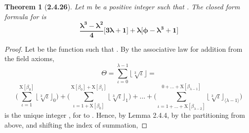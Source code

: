 \documentclass[a4paper, 12pt]{article}
\theoremstyle{plain}
\newtheorem*{theorem*}{Theorem}
\begin{document}
\begin{theorem*}[\textbf{2.4.26}]
    Let m be a positive integer such that 
    \bm{$\big \lfloor \sqrt[3] \phi \big \rfloor = \lambda$}.
    The closed form formula for 
    is 
    \begin{equation*}
        \bm{
            \frac{
                \lambda ^3 - \lambda ^2
            }
            {4}
            \Bigg[ 3 \lambda + 1 \Bigg]
                + 
            \lambda
            \Bigg[
                \phi - \lambda ^3 + 1
            \Bigg]
        }
    \end{equation*}
\end{theorem*}
\begin{proof}
    Let  be the function 
    such that .
    By the associative law for addition from the field axioms,
    \begin{equation*}
        \Theta
            =
        \sum_{\iota=0}^{\lambda - 1}
                \big \lfloor \sqrt[3] \iota \big \rfloor
            =
    \end{equation*}
    \begin{equation*}
        \Bigg(
            \sum_{ \iota = 1 }^{ \mathrm{X} [\beta_0] }
                \big \lfloor \sqrt[3] \iota \big \rfloor_0
        \Bigg)
            +
        \Bigg(
            \sum_{
                \iota = 1 + \mathrm{X}[\beta_0]
            }^{ 
                \mathrm{X}[\beta_0] + \mathrm{X}[\beta_1]
            }
                \big \lfloor \sqrt[3] \iota \big \rfloor_1
        \Bigg)
            +
        \dots
            +
        \Bigg(
            \sum_{
                \iota = 1 + \dots 
                    + 
                \mathrm{X}[\beta_{\lambda - 2}]
            }^{ 
                0 + \dots
                    +
                \mathrm{X}[\beta_{ \lambda - 1 }]
            }
                \big \lfloor \sqrt[3] \iota \big \rfloor_{ \langle \lambda - 1 \rangle }
        \Bigg)
    \end{equation*}
    \bm{$\big \lfloor \sqrt[3] \iota \big \rfloor_\tau$}
    is the unique integer \bm{$\beta_\tau$},
    for  to 
    \bm{$\big \langle \lambda - 1 \big \rangle$}.
    Hence, by Lemma 2.4.4,
    by the partitioning from above, 
    and shifting the index of summation,

\end{proof}
\end{document}
